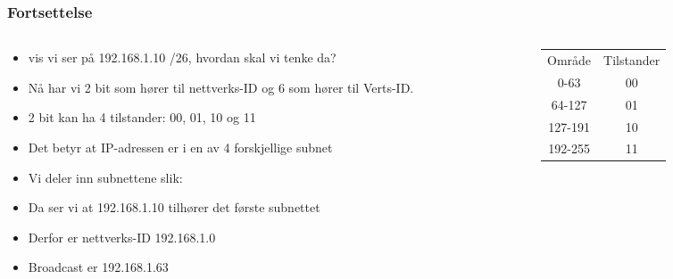 \documentclass[aspectratio=169,xcolor=dvipsnames]{beamer}
\begin{document}
\begin{frame}
	\frametitle{Fortsettelse}

	\begin{columns}
		\begin{column}{0.5\textwidth}

			\begin{itemize}
				\item vis vi ser på 192.168.1.10 /26, hvordan skal vi tenke da?
				\item Nå har vi 2 bit som hører til nettverks-ID og 6 som hører til Verts-ID.
				\item 2 bit kan ha 4 tilstander: 00, 01, 10 og 11
				\item Det betyr at IP-adressen er i en av 4 forskjellige subnet
				\item Vi deler inn subnettene slik:
				\item Da ser vi at 192.168.1.10 tilhører det første subnettet
				\item Derfor er nettverks-ID 192.168.1.0
				\item Broadcast er 192.168.1.63 
			\end{itemize}
			
		\end{column}

		\begin{column}{0.5\textwidth}
\begin{tabular}{ c c }
	Område & Tilstander\\
	0-63 & 00 \\
	64-127 & 01 \\
	127-191 & 10 \\
	192-255 & 11 
\end{tabular}
		\end{column}
	\end{columns}
\end{frame}
\end{document}
